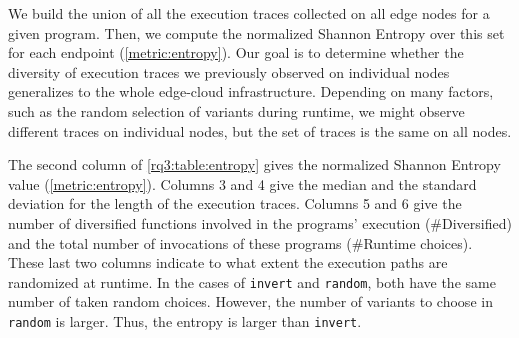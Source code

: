 We build the union of all the execution traces collected on all edge nodes for a given program. 
Then, we compute the normalized Shannon Entropy over this set for each endpoint (\autoref{metric:entropy}).
Our goal is to determine whether the diversity of execution traces we previously observed on individual nodes generalizes to the whole edge-cloud infrastructure. Depending on many factors, such as the random selection of variants during runtime, we might observe different traces on individual nodes, but the set of traces is the same on all nodes.



The second column of \autoref{rq3:table:entropy} gives the normalized Shannon Entropy value (\autoref{metric:entropy}). Columns 3 and 4 give the median and the standard deviation for the length of the execution traces. Columns 5 and 6 give 
the number of diversified functions involved in the programs' execution (\#Diversified) and the total number of invocations of these programs (\#Runtime choices). These last two columns indicate to what extent the execution paths are randomized at runtime. In the cases of \texttt{invert} and \texttt{random}, both have the same number of taken random choices. However, the number of variants to choose in \texttt{random} is larger. Thus, the entropy is larger than \texttt{invert}.

